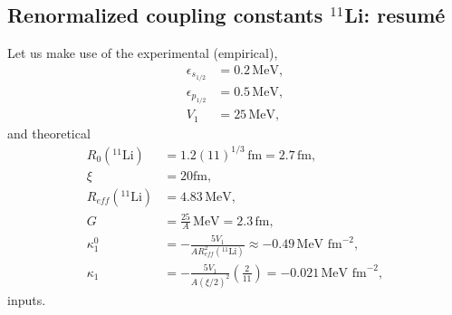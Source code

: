 \begin{subappendices}
 \section{Renormalized coupling constants $^{11}$Li: resum\'e}\label{C2SF2}
 Let us make use of the experimental (empirical),
 \begin{align*}
 \epsilon_{s_{1/2}}&=0.2\, \text{MeV},\\
  \epsilon_{p_{1/2}}&=0.5\, \text{MeV},\\
  V_1&=25\, \text{MeV},
 \end{align*}
and theoretical
  \begin{align*}
R_0(^{11}\text{Li})&=1.2 (11)^{1/3}\,\text{fm}=2.7\,\text{fm},\\
\xi&=20\text{fm},\\
R_{eff}(^{11}\text{Li})&=4.83\,\text{MeV},\\
G&=\frac{25}{A}\,\text{MeV}=2.3\,\text{fm},\\
\kappa_1^0&=-\frac{5V_1}{A R_{eff}^2(^{11}\text{Li})}\approx -0.49\,\text{MeV fm}^{-2},\\
\kappa_1&=-\frac{5V_1}{A \left(\xi/2\right)^2}\left(\frac{2}{11}\right)= -0.021\,\text{MeV fm}^{-2},
  \end{align*}
 inputs.
 

\end{subappendices}
